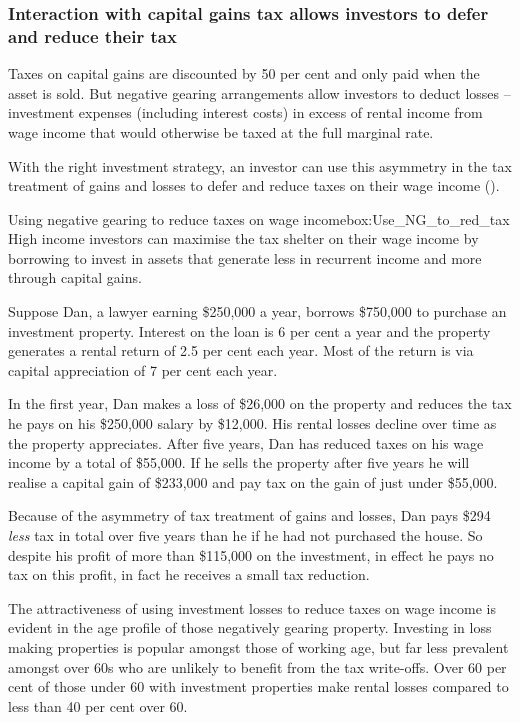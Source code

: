 \documentclass{grattan}\usepackage[]{graphicx}\usepackage[]{color}
\begin{document}
\subsubsection{Interaction with capital gains tax allows investors to defer and reduce their tax}
Taxes on capital gains are discounted by 50 per cent and only paid when the asset is sold. But negative gearing arrangements allow investors to deduct losses -- investment expenses (including interest costs) in excess of rental income from wage income that would otherwise be taxed at the full marginal rate.

With the right investment strategy, an investor can use this asymmetry in the tax treatment of gains and losses to defer and reduce taxes on their wage income ().

\begin{smallbox}{Using negative gearing to reduce taxes on wage income}{box:Use_NG_to_red_tax}
High income investors can maximise the tax shelter on their wage income by borrowing to invest in assets that generate less in recurrent income and more through capital gains. 

Suppose Dan, a lawyer earning \$250,000 a year, borrows \$750,000 to purchase an investment property. Interest on the loan is 6 per cent a year and the property generates a rental return of 2.5 per cent each year.  Most of the return is via capital appreciation of 7 per cent each year.

In the first year, Dan makes a loss of \$26,000 on the property and reduces the tax he pays on his \$250,000 salary by \$12,000. His rental losses decline over time as the property appreciates. After five years, Dan has reduced taxes on his wage income by a total of \$55,000. If he sells the property after five years he will realise a capital gain of \$233,000 and pay tax on the gain of just under \$55,000. 

Because of the asymmetry of tax treatment of gains and losses, Dan pays \$294 \emph{less} tax in total over five years than he if he had not purchased the house. So despite his profit of more than \$115,000 on the investment, in effect he pays no tax on this profit, in fact he receives a small tax reduction.
\end{smallbox}

The attractiveness of using investment losses to reduce taxes on wage income is evident in the age profile of those negatively gearing property. Investing in loss making properties is popular amongst those of working age, but far less prevalent amongst over 60s who are unlikely to benefit from the tax write-offs. Over 60 per cent of those under 60 with investment properties make rental losses compared to less than 40 per cent over 60.
\end{document}
